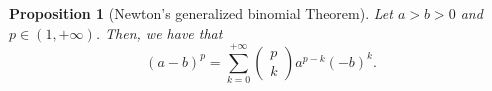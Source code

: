 \documentclass[12pt]{article}
\numberwithin{equation}{section}
\newtheorem{prop}[thm]{Proposition}
\begin{document}
\begin{appendix}
\begin{prop}[Newton's generalized binomial Theorem]
Let $a>b>0$ and $p\in (1,+\infty)$. Then, we have that 
\begin{equation}\label{Bolo}
(a-b)^p =\sum_{k=0}^{+\infty}\begin{pmatrix}
p\\k
\end{pmatrix}a^{p-k}(-b)^k.
\end{equation}
\end{prop}








\end{appendix}
\end{document}
